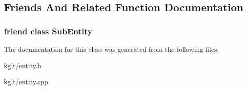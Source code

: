 \subsection{Friends And Related Function Documentation}
\hypertarget{classkglt_1_1_entity_a5102c4966341431b89134719b3998e3b}{
\subsubsection[{Sub\-Entity}]{\setlength{\rightskip}{0pt plus 5cm}friend class {\bf Sub\-Entity}\hspace{0.3cm}{\ttfamily [friend]}}}\label{classkglt_1_1_entity_a5102c4966341431b89134719b3998e3b}


The documentation for this class was generated from the following files\-:\begin{DoxyCompactItemize}
\item 
kglt/\hyperlink{entity_8h}{entity.\-h}\item 
kglt/\hyperlink{entity_8cpp}{entity.\-cpp}\end{DoxyCompactItemize}
